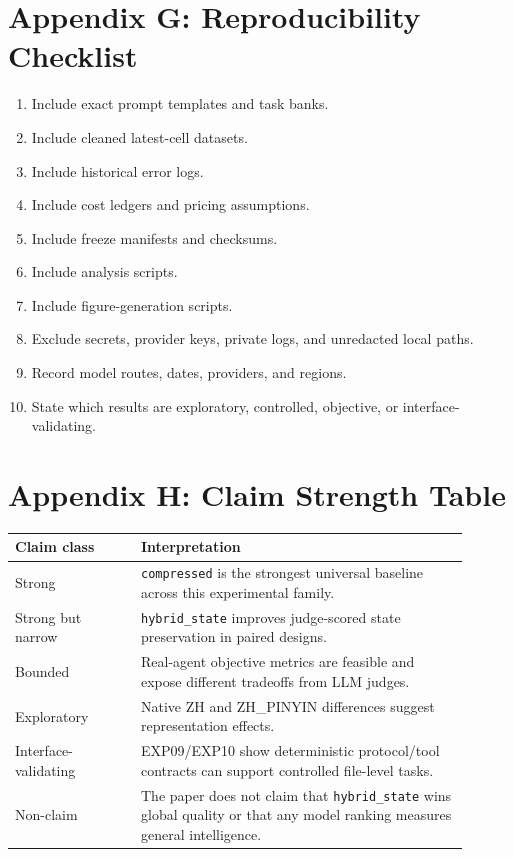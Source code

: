 \documentclass[11pt]{article}
\begin{document}
\section{Appendix G: Reproducibility Checklist}
\begin{enumerate}
\item Include exact prompt templates and task banks.
\item Include cleaned latest-cell datasets.
\item Include historical error logs.
\item Include cost ledgers and pricing assumptions.
\item Include freeze manifests and checksums.
\item Include analysis scripts.
\item Include figure-generation scripts.
\item Exclude secrets, provider keys, private logs, and unredacted local paths.
\item Record model routes, dates, providers, and regions.
\item State which results are exploratory, controlled, objective, or interface-validating.
\end{enumerate}

\section{Appendix H: Claim Strength Table}
\begin{longtable}{p{0.25\linewidth}p{0.65\linewidth}}
\toprule
Claim class & Interpretation \\
\midrule
\endhead
Strong & \texttt{compressed} is the strongest universal baseline across this experimental family. \\
Strong but narrow & \texttt{hybrid\_state} improves judge-scored state preservation in paired designs. \\
Bounded & Real-agent objective metrics are feasible and expose different tradeoffs from LLM judges. \\
Exploratory & Native ZH and ZH\_PINYIN differences suggest representation effects. \\
Interface-validating & EXP09/EXP10 show deterministic protocol/tool contracts can support controlled file-level tasks. \\
Non-claim & The paper does not claim that \texttt{hybrid\_state} wins global quality or that any model ranking measures general intelligence. \\
\bottomrule
\end{longtable}
\end{document}
